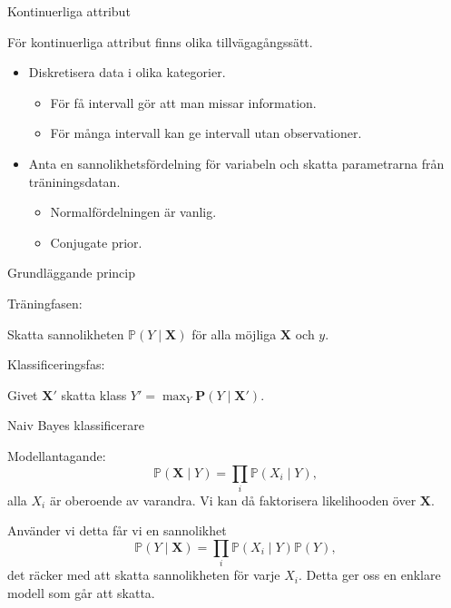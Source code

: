 \documentclass[10pt,english]{beamer}
\begin{document}
\begin{frame}{Kontinuerliga attribut}

    För kontinuerliga attribut finns olika tillvägagångssätt.

    \begin{itemize}
        \item Diskretisera data i olika kategorier.
        \begin{itemize}
            \item För få intervall gör att man missar information.
            \item För många intervall kan ge intervall utan observationer.
        \end{itemize}
        \item Anta en sannolikhetsfördelning för variabeln och skatta parametrarna från träniningsdatan.
        \begin{itemize}
            \item Normalfördelningen är vanlig.
            \item Conjugate prior.
        \end{itemize}
    \end{itemize}
    
\end{frame}

\begin{frame}{Grundläggande princip}

    Träningfasen:

    Skatta sannolikheten $\mathbb{P}(Y \mid \mathbf{X})$ för alla möjliga $\mathbf{X}$ och $y$.

    Klassificeringsfas:

    Givet $\mathbf{X}'$ skatta klass $Y' = \max_Y \mathbf{P}(Y \mid \mathbf{X}')$.
    
\end{frame}

\begin{frame}{Naiv Bayes klassificerare}

    Modellantagande:
    \begin{equation*}
        \mathbb{P}(\mathbf{X} \mid Y) = \prod_i \mathbb{P}(X_i \mid Y),
    \end{equation*}
    alla $X_i$ är oberoende av varandra. Vi kan då faktorisera likelihooden över $\mathbf{X}$.

    Använder vi detta får vi en sannolikhet
    \begin{equation*}
        \mathbb{P}(Y \mid \mathbf{X}) = \prod_i \mathbb{P}(X_i \mid Y) \mathbb{P}(Y),
    \end{equation*}
    det räcker med att skatta sannolikheten för varje $X_i$. Detta ger oss en enklare modell som går att skatta.
    
\end{frame}
\end{document}
